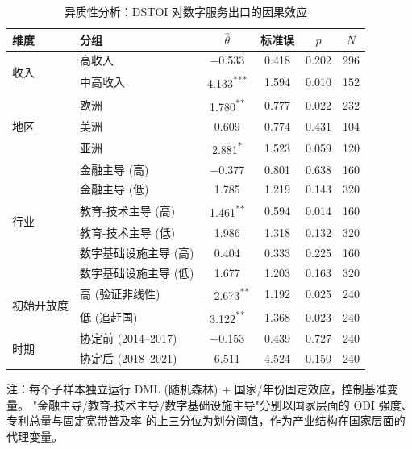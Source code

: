 \documentclass[11pt,a4paper]{article}
\begin{document}
\begin{table}[H]
\centering\small
\caption{异质性分析：DSTOI 对数字服务出口的因果效应}\label{tab:het}
\begin{threeparttable}
\begin{tabular}{llcccc}
\toprule
维度 & 分组 & $\hat\theta$ & 标准误 & $p$ & $N$ \\
\midrule
\multirow{2}{*}{收入} & 高收入 & $-$0.533 & 0.418 & 0.202 & 296 \\
                     & 中高收入 & 4.133\textsuperscript{***} & 1.594 & 0.010 & 152 \\
\midrule
\multirow{3}{*}{地区} & 欧洲   & 1.780\textsuperscript{**} & 0.777 & 0.022 & 232 \\
                     & 美洲   & 0.609 & 0.774 & 0.431 & 104 \\
                     & 亚洲   & 2.881\textsuperscript{*}  & 1.523 & 0.059 & 120 \\
\midrule
\multirow{6}{*}{行业} & 金融主导 (高)        & $-$0.377 & 0.801 & 0.638 & 160 \\
                     & 金融主导 (低)        & 1.785 & 1.219 & 0.143 & 320 \\
                     & 教育-技术主导 (高)   & 1.461\textsuperscript{**}  & 0.594 & 0.014 & 160 \\
                     & 教育-技术主导 (低)   & 1.986 & 1.318 & 0.132 & 320 \\
                     & 数字基础设施主导 (高) & 0.404 & 0.333 & 0.225 & 160 \\
                     & 数字基础设施主导 (低) & 1.677 & 1.203 & 0.163 & 320 \\
\midrule
\multirow{2}{*}{初始开放度} & 高 (验证非线性) & $-$2.673\textsuperscript{**} & 1.192 & 0.025 & 240 \\
                          & 低 (追赶国)     & 3.122\textsuperscript{**}    & 1.368 & 0.023 & 240 \\
\midrule
\multirow{2}{*}{时期} & 协定前 (2014--2017) & $-$0.153 & 0.439 & 0.727 & 240 \\
                     & 协定后 (2018--2021) & 6.511 & 4.524 & 0.150 & 240 \\
\bottomrule
\end{tabular}
\begin{tablenotes}\footnotesize
\item 注：每个子样本独立运行 DML (随机森林) + 国家/年份固定效应，控制基准变量。
"金融主导/教育-技术主导/数字基础设施主导"分别以国家层面的 ODI 强度、专利总量与固定宽带普及率
的上三分位为划分阈值，作为产业结构在国家层面的代理变量。
\end{tablenotes}
\end{threeparttable}
\end{table}
\end{document}
